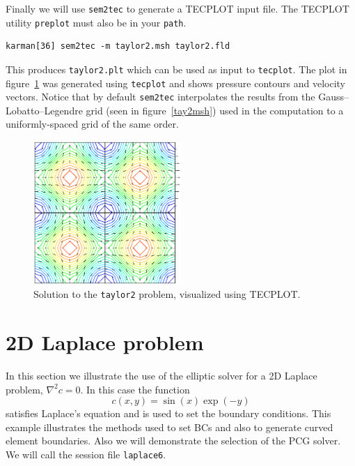 \documentclass[11pt,a4paper]{report}
\begin{document}
Finally we will use \texttt{sem2tec} to generate a TECPLOT input file.
The TECPLOT utility \texttt{preplot} must also be in your \texttt{path}.
{\small
\begin{verbatim}
karman[36] sem2tec -m taylor2.msh taylor2.fld
\end{verbatim}
}
\noindent
This produces \texttt{taylor2.plt} which can be used as input to
\texttt{tecplot}.  The plot in figure~\ref{tay2soln} was generated
using \texttt{tecplot} and shows pressure contours and velocity
vectors.  Notice that by default \texttt{sem2tec} interpolates the
results from the Gauss--Lobatto--Legendre grid (seen in
figure~\ref{tay2msh}) used in the computation to a uniformly-spaced
grid of the same order.
\begin{figure}
\begin{center}
\includegraphics[width=0.5\textwidth]{taylor2.eps}
\end{center}
\caption{
\label{tay2soln}
  Solution to the \texttt{taylor2} problem, visualized using TECPLOT.
}
\end{figure}

\section{2D Laplace problem}

In this section we illustrate the use of the elliptic solver for a 2D
Laplace problem, $\nabla^2 c = 0$.  In this case the function
\begin{equation}
  c(x,y) = \sin(x) \exp(-y)
\end{equation}
satisfies Laplace's equation and is used to set the boundary
conditions.  This example illustrates the methods used to set BCs and
also to generate curved element boundaries.  Also we will demonstrate
the selection of the PCG solver.  We will call the session file
\texttt{laplace6}.
\end{document}
